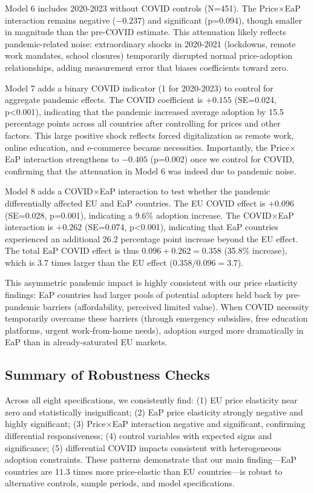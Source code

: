 \documentclass[12pt,review]{elsarticle}
\begin{document}
Model 6 includes 2020-2023 without COVID controls (N=451). The Price$\times$EaP interaction remains negative ($-0.237$) and significant (p=0.094), though smaller in magnitude than the pre-COVID estimate. This attenuation likely reflects pandemic-related noise: extraordinary shocks in 2020-2021 (lockdowns, remote work mandates, school closures) temporarily disrupted normal price-adoption relationships, adding measurement error that biases coefficients toward zero.

Model 7 adds a binary COVID indicator (1 for 2020-2023) to control for aggregate pandemic effects. The COVID coefficient is $+0.155$ (SE=0.024, p<0.001), indicating that the pandemic increased average adoption by 15.5 percentage points across all countries after controlling for prices and other factors. This large positive shock reflects forced digitalization as remote work, online education, and e-commerce became necessities. Importantly, the Price$\times$EaP interaction strengthens to $-0.405$ (p=0.002) once we control for COVID, confirming that the attenuation in Model 6 was indeed due to pandemic noise.

Model 8 adds a COVID$\times$EaP interaction to test whether the pandemic differentially affected EU and EaP countries. The EU COVID effect is $+0.096$ (SE=0.028, p=0.001), indicating a 9.6\% adoption increase. The COVID$\times$EaP interaction is $+0.262$ (SE=0.074, p<0.001), indicating that EaP countries experienced an additional 26.2 percentage point increase beyond the EU effect. The total EaP COVID effect is thus $0.096 + 0.262 = 0.358$ (35.8\% increase), which is 3.7 times larger than the EU effect ($0.358 / 0.096 = 3.7$).

This asymmetric pandemic impact is highly consistent with our price elasticity findings: EaP countries had larger pools of potential adopters held back by pre-pandemic barriers (affordability, perceived limited value). When COVID necessity temporarily overcame these barriers (through emergency subsidies, free education platforms, urgent work-from-home needs), adoption surged more dramatically in EaP than in already-saturated EU markets.

\subsection{Summary of Robustness Checks}

Across all eight specifications, we consistently find: (1) EU price elasticity near zero and statistically insignificant; (2) EaP price elasticity strongly negative and highly significant; (3) Price$\times$EaP interaction negative and significant, confirming differential responsiveness; (4) control variables with expected signs and significance; (5) differential COVID impacts consistent with heterogeneous adoption constraints. These patterns demonstrate that our main finding—EaP countries are 11.3 times more price-elastic than EU countries—is robust to alternative controls, sample periods, and model specifications.
\end{document}
